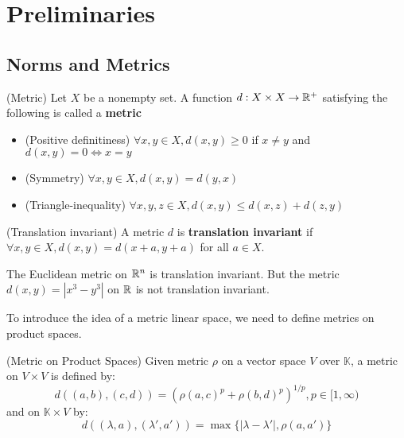 \section{Preliminaries}   

\subsection{Norms and Metrics}

\begin{defn}
(Metric) Let $X$ be a nonempty set. 
A function $d: X \times X \to \mathbb{R}^+$ satisfying the following is called a  \textbf{metric}  

\begin{itemize}
    \item (Positive definitiness) $\forall x,y \in X, d(x,y)\geq 0$ if $x \neq y$ and $d(x,y)=0 \iff x=y$
    \item (Symmetry) $\forall x,y \in X, d(x,y)=d(y,x)$
    \item (Triangle-inequality) $\forall x,y,z \in X, d(x,y) \leq d(x,z) + d(z,y)$
\end{itemize}

\end{defn}
\begin{defn}
    (Translation invariant) A metric $d$ is \textbf{translation invariant} if $\forall x,y \in X, d(x,y)=d(x+a,y+a)$ for all $a \in X$.
\end{defn} 

\begin{eg}
    The Euclidean metric on $\mathbb{R}^n$ is translation invariant.  
    But the metric $d(x,y)=|x^3-y^3|$ on $\mathbb{R}$ is not translation invariant.
\end{eg}

To introduce the idea of a metric linear space, we need to define metrics on product spaces.  

\begin{defn} (Metric on Product Spaces)
    Given metric $\rho$ on a vector space $V$ over $\mathbb{K}$, a metric on $V \times V$ is defined by:  
    \begin{equation*}
        d((a,b),(c,d)) = (\rho(a,c)^p+\rho(b,d)^p)^{1/p}, p \in [1,\infty)
    \end{equation*}  
    and on $\mathbb{K} \times V$ by:
    \begin{equation*}
        d((\lambda, a),(\lambda',a')) = \max \{|\lambda-\lambda'|, \rho (a, a')\}
    \end{equation*}
\end{defn}

